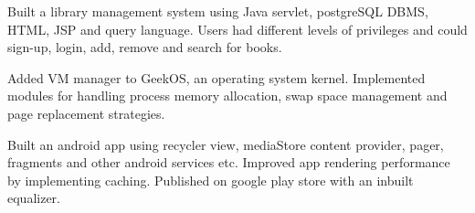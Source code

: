 



\begin{cventries}

  \cvproject
    {
      \begin{cvitems} %
         \item{  Built a library management system using Java servlet, postgreSQL DBMS, HTML, JSP and query language. Users  had different levels of privileges and could sign-up, login, add, remove and search for books.}
		\item{  Added VM manager to GeekOS, an operating system kernel. Implemented modules for handling process memory allocation, swap space management and page replacement strategies. }
        \item{  Built an android app using recycler view, mediaStore content provider, pager, fragments and other android services etc. Improved app rendering performance by implementing caching. Published on google play store with an inbuilt equalizer.}
      \end{cvitems}
    }

\end{cventries}